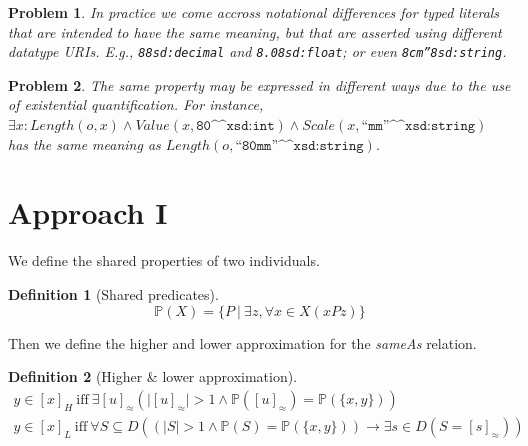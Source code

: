 \documentclass[11pt,a4paper,notitlepage,onecolumn,twoside]{article}
\newtheorem{definition}{Definition}
\newtheorem{problem}{Problem}
\begin{document}
\begin{problem}
In practice we come accross notational differences for typed literals that are intended to have the same meaning, but that are asserted using different datatype URIs. E.g., \texttt{8^^xsd:decimal} and \texttt{8.0^^xsd:float}; or even \texttt{8cm''^^xsd:string}.
\end{problem}

\begin{problem}
The same property may be expressed in different ways due to the use of existential quantification. For instance,
$\exists x: Length(o, x) \land Value(x, \texttt{80^^xsd:int}) \land Scale(x, \texttt{``mm''^^xsd:string})$ has the same meaning as $Length(o, \texttt{``80mm''^^xsd:string})$.
\end{problem}

\section{Approach I}

We define the shared properties of two individuals.

\begin{definition}[Shared predicates]
\label{def:shared_predicates}
\begin{equation}
\mathbb{P}(X) = \{ P \  \vert \  \exists z, \forall x \in X (xPz) \}
\end{equation}
\end{definition}

Then we define the higher and lower approximation for the \emph{sameAs} relation.

\begin{definition}[Higher \& lower approximation]
\label{def:higher_lower_approximation}
\begin{align}
y \in [x]_H \  \text{iff} \  \exists [u]_{\approx} (
    \vert [u]_{\approx} \vert > 1
  \land
    \mathbb{P}([u]_{\approx}) = \mathbb{P}(\{ x, y \})
  ) \\
y \in [x]_L \  \text{iff} \  \forall S \subseteq D (
    (\vert S \vert > 1 \land \mathbb{P}(S) = \mathbb{P}(\{ x, y \}))
  \rightarrow
    \exists s \in D (S = [s]_{\approx})
  )
\end{align}
\end{definition}
\end{document}

